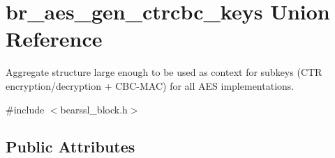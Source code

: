 \hypertarget{unionbr__aes__gen__ctrcbc__keys}{}\section{br\+\_\+aes\+\_\+gen\+\_\+ctrcbc\+\_\+keys Union Reference}
\label{unionbr__aes__gen__ctrcbc__keys}


Aggregate structure large enough to be used as context for subkeys (C\+TR encryption/decryption + C\+B\+C-\/\+M\+AC) for all A\+ES implementations.  




{\ttfamily \#include $<$bearssl\+\_\+block.\+h$>$}

\subsection*{Public Attributes}
